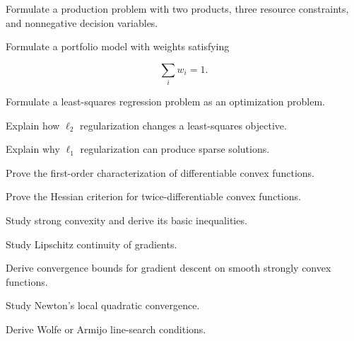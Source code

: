 \begin{exercise}[3]
Formulate a production problem with two products, three resource
constraints, and nonnegative decision variables.
\end{exercise}

\begin{exercise}[3]
Formulate a portfolio model with weights satisfying

\[
\sum_iw_i=1.
\]
\end{exercise}

\begin{exercise}[3]
Formulate a least-squares regression problem as an optimization problem.
\end{exercise}

\begin{exercise}[3]
Explain how \(\ell_2\) regularization changes a least-squares objective.
\end{exercise}

\begin{exercise}[3]
Explain why \(\ell_1\) regularization can produce sparse solutions.
\end{exercise}

\begin{exercise}[4]
Prove the first-order characterization of differentiable convex
functions.
\end{exercise}

\begin{exercise}[4]
Prove the Hessian criterion for twice-differentiable convex functions.
\end{exercise}

\begin{exercise}[4]
Study strong convexity and derive its basic inequalities.
\end{exercise}

\begin{exercise}[4]
Study Lipschitz continuity of gradients.
\end{exercise}

\begin{exercise}[4]
Derive convergence bounds for gradient descent on smooth strongly convex
functions.
\end{exercise}

\begin{exercise}[4]
Study Newton's local quadratic convergence.
\end{exercise}

\begin{exercise}[4]
Derive Wolfe or Armijo line-search conditions.
\end{exercise}


